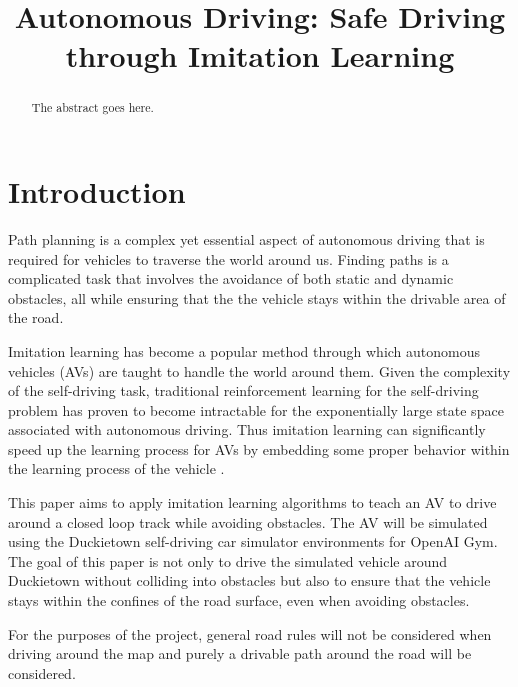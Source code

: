 \documentclass[conference]{IEEEtran}
\begin{document}
\title{Autonomous Driving: Safe Driving through Imitation Learning}

\author{
}


\maketitle

\begin{abstract}
The abstract goes here.
\end{abstract}

\IEEEpeerreviewmaketitle

\section{Introduction}
Path planning is a complex yet essential aspect of autonomous driving that is required
for vehicles to traverse the world around us. Finding paths is a complicated task that 
involves the avoidance of both static and dynamic obstacles, all while ensuring that the
the vehicle stays within the drivable area of the road. \par
Imitation learning has become a popular method through which autonomous vehicles (AVs) are 
taught to handle the world around them. Given the complexity of the self-driving task,
traditional reinforcement learning for the self-driving problem has proven to become intractable
for the exponentially large state space associated with autonomous driving. Thus imitation learning
can significantly speed up the learning process for AVs by embedding some proper behavior within 
the learning process of the vehicle \cite{imitationLearning}. \par
This paper aims to apply imitation learning algorithms to teach an AV to drive around a closed loop
track while avoiding obstacles. The AV will be simulated using the Duckietown \cite{gym_duckietown} 
self-driving car simulator environments for OpenAI Gym. The goal of this paper is not only to
drive the simulated vehicle around Duckietown without colliding into obstacles but also to ensure
that the vehicle stays within the confines of the road surface, even when avoiding obstacles. \par
For the purposes of the project, general road rules will not be considered when driving
around the map and purely a drivable path around the road will be considered. 
\end{document}
